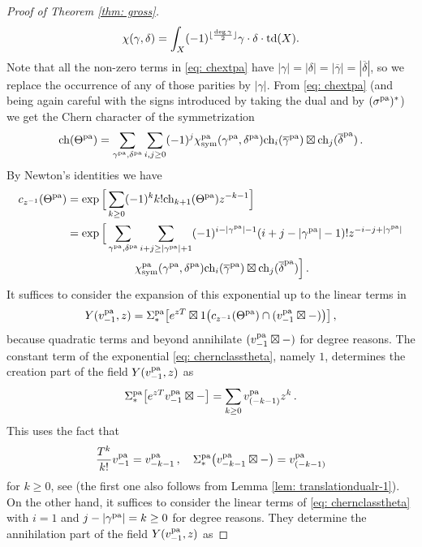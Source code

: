 \documentclass[a4paper, 12pt]{amsart}
\begin{document}
\begin{proof}[Proof of Theorem \ref{thm: gross}]
\[\chi(\gamma, \delta)=\int_X(-1)^{\lfloor\frac{\deg \gamma}{2}\rfloor}\gamma\cdot \delta \cdot \mathrm{td}(X).\]
Note that all the non-zero terms in \eqref{eq: chextpa} have $|\gamma|=|\delta|=|\overline \gamma|=|\overline \delta|$, so we replace the occurrence of any of those parities by $|\gamma|$.
From \eqref{eq: chextpa} (and being again careful with the signs introduced by taking the dual and by $(\sigma^{\mathop{\rm pa}\nolimits})^\ast$) we get the Chern character of the symmetrization 
\begin{equation}
\label{eq: chthetapa} \mathrm{ch}(\Theta^{\mathop{\rm pa}\nolimits})=\sum_{\gamma^{\mathop{\rm pa}\nolimits}, \delta^{\mathop{\rm pa}\nolimits}}\sum_{i, j\geq 0}(-1)^{j}\chi^{\mathop{\rm pa}\nolimits}_{\text{sym}}(\gamma^{\mathop{\rm pa}\nolimits}, \delta^{\mathop{\rm pa}\nolimits})\mathrm{ch}_i(\overline \gamma^{\mathop{\rm pa}\nolimits})\boxtimes\mathrm{ch}_j(\overline \delta^{\mathop{\rm pa}\nolimits})\,.
\end{equation}
By Newton's identities we have
\begin{align}\label{eq: chernclasstheta}c_{z^{-1}}(\Theta^{\mathop{\rm pa}\nolimits})&=\exp\Big[\sum_{k\geq 0}(-1)^{k}k!\mathrm{ch}_{k+1}(\Theta^{\mathop{\rm pa}\nolimits})z^{-k-1}\Big]\\ \nonumber
&=\exp\Big[\sum_{\gamma^{\mathop{\rm pa}\nolimits}, \delta^{\mathop{\rm pa}\nolimits}}\sum_{i+j\geq |\gamma^{\mathop{\rm pa}\nolimits}|+1}(-1)^{i-|\gamma^{\mathop{\rm pa}\nolimits}|-1}(i+j-|\gamma^{\mathop{\rm pa}\nolimits}|-1)!z^{-i-j+|\gamma^{\mathop{\rm pa}\nolimits}|}\\
&\qquad \qquad\qquad \chi^{\mathop{\rm pa}\nolimits}_{\text{sym}}(\gamma^{\mathop{\rm pa}\nolimits}, \delta^{\mathop{\rm pa}\nolimits})\mathrm{ch}_i(\overline \gamma^{\mathop{\rm pa}\nolimits})\boxtimes\mathrm{ch}_j(\overline \delta^{\mathop{\rm pa}\nolimits})\Big]\, .\nonumber
\end{align}
It suffices to consider the expansion of this exponential up to the linear terms in
$$Y(v^{\mathop{\rm pa}\nolimits}_{-1},z)= \Sigma_\ast^{\mathop{\rm pa}\nolimits}\big[e^{zT}\boxtimes 1\big(c_{z^{-1}}(\Theta^{\mathop{\rm pa}\nolimits})\cap (v^{\mathop{\rm pa}\nolimits}_{-1}\boxtimes -)\big)\big]\,,
$$
because quadratic terms and beyond annihilate $(v^{\mathop{\rm pa}\nolimits}_{-1}\boxtimes -)$ for degree reasons. The constant term of the exponential \eqref{eq: chernclasstheta}, namely $1$, determines the creation part of the field $Y(v^{\mathop{\rm pa}\nolimits}_{-1},z)$ as
\begin{equation}\label{eq: creation part}
    \Sigma_\ast^{\mathop{\rm pa}\nolimits}\big[e^{zT} v_{-1}^{\mathop{\rm pa}\nolimits}\boxtimes -\big]=\sum_{k\geq 0}v^{\mathop{\rm pa}\nolimits}_{(-k-1)}z^k\,.
\end{equation}
This uses the fact that
\[\frac{T^k}{k!} v_{-1}^{\mathop{\rm pa}\nolimits}=v_{-k-1}^{\mathop{\rm pa}\nolimits}\,, \quad \Sigma_\ast^{\mathop{\rm pa}\nolimits}\big(v_{-k-1}^{\mathop{\rm pa}\nolimits}\boxtimes -\big)=v_{(-k-1)}^{\mathop{\rm pa}\nolimits}\]
for $k\geq 0$, see \cite[Lemmas 5.3, 5.5]{Gr19} (the first one also follows from Lemma \ref{lem: translationdualr-1}). On the other hand, it suffices to consider the linear terms of \eqref{eq: chernclasstheta} with $i=1$ and $j-|\gamma^{\mathop{\rm pa}\nolimits}|=k\geq 0$ for degree reasons. They determine the annihilation part of the field $Y(v^{\mathop{\rm pa}\nolimits}_{-1},z)$ as 

\end{proof}
\end{document}

